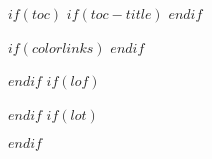 $if(toc)$
$if(toc-title)$
\renewcommand{\contentsname}{\centering\LARGE\cnspace{0.5}{$toc-title$}}
$endif$
{
$if(colorlinks)$
\hypersetup{linkcolor=$if(toccolor)$$toccolor$$else$$endif$}
$endif$
\setcounter{tocdepth}{$toc-depth$}
\tableofcontents
{}
}
\vspace{1cm}

$endif$
$if(lof)$
\listoffigures
$endif$
$if(lot)$
\listoftables
$endif$